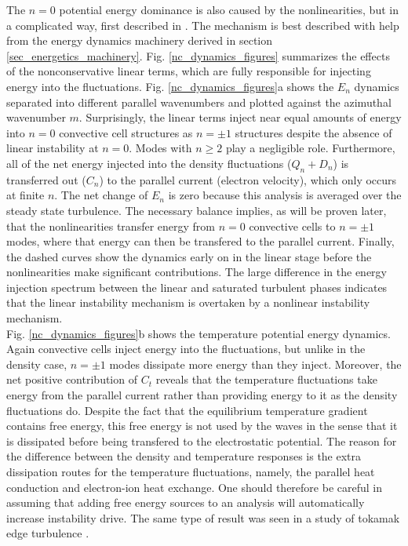 \documentclass[12pt]{article}
\begin{document}
The $n=0$ potential energy dominance is also caused by the nonlinearities, but in a complicated way, first described in \cite{biskamp1995,drake1995}. The mechanism is best described with
help from the energy dynamics machinery derived in section \ref{sec_energetics_machinery}. Fig. \ref{nc_dynamics_figures} summarizes the effects of the nonconservative linear terms, which are
fully responsible for injecting energy into the fluctuations. Fig. \ref{nc_dynamics_figures}a shows the $E_n$ dynamics separated into different parallel wavenumbers and plotted
against the azimuthal wavenumber $m$. Surprisingly, the linear terms inject near equal amounts of energy into $n=0$ convective cell structures as $n= \pm 1$ structures despite the absence
of linear instability at $n=0$. Modes with $n \ge 2$ play a negligible role. Furthermore, all of the net energy injected into the density fluctuations ($Q_n + D_n$) is transferred out ($C_n$) to
the parallel current (electron velocity), which only occurs at finite $n$. The net change of $E_n$ is zero because this analysis is averaged over the steady state
turbulence. The necessary balance implies, as will be proven later, that the nonlinearities transfer energy from $n=0$ convective cells to $n = \pm 1$ modes, where that energy can then
be transfered to the parallel current.
Finally, the dashed curves show the dynamics early on in the linear stage before the nonlinearities make significant contributions. The large difference in the energy injection spectrum between
the linear and saturated turbulent phases indicates that the linear instability mechanism is overtaken by a nonlinear instability mechanism. \\

Fig. \ref{nc_dynamics_figures}b shows the temperature potential energy dynamics. Again convective cells inject energy into the fluctuations, but unlike in the density case, $n = \pm 1$ modes
dissipate more energy than they inject. Moreover, the net positive contribution of $C_t$ reveals that the temperature fluctuations take energy from the parallel current rather than providing
energy to it as the density fluctuations do. Despite the fact that the equilibrium temperature gradient contains free energy, this free energy is not used by the waves in the sense that it 
is dissipated before being transfered to the electrostatic potential. The reason for the difference
between the density and temperature responses is the extra dissipation routes for the temperature fluctuations, namely, the parallel heat conduction and electron-ion heat exchange.
One should therefore be careful in assuming that adding free energy sources to an analysis will automatically increase instability drive.
The same type of result was seen in a study of tokamak edge turbulence \cite{zeiler1997}. \\
\end{document}
